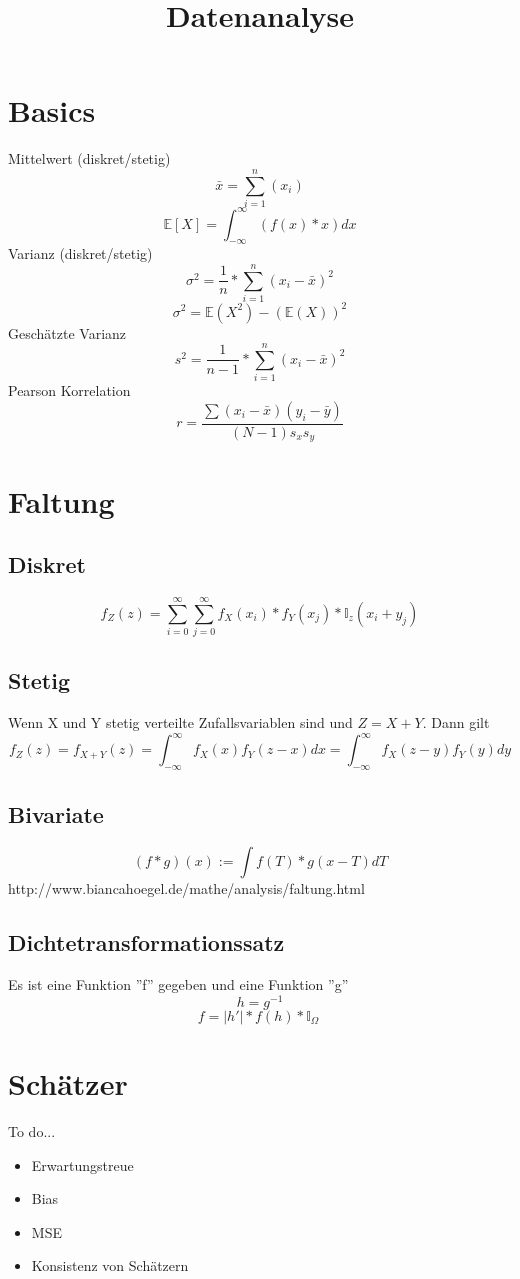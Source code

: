 \documentclass{article}
\title{Datenanalyse}
\begin{document}
	\maketitle
	\section{Basics}
	Mittelwert (diskret/stetig)
	\[\bar{x} = \sum_{i=1}^{n}(x_i) \]	
	\[\mathbb{E}[X]=\int_{-\infty}^{\infty} (f(x)*x) dx\]
	Varianz (diskret/stetig)
	\[{\sigma}^{2} = \frac{1}{n}*\sum_{i=1}^{n}(x_i - \bar{x})^2\]
	\[{\sigma}^{2} = \mathbb{E}(X^2)-(\mathbb{E}(X))^2\]
	Geschätzte Varianz
	\[{s}^{2} = \frac{1}{n-1}*\sum_{i=1}^{n}(x_i - \bar{x})^2\]
	Pearson Korrelation
	\[r=\frac{\sum(x_i-\bar{x})(y_i-\bar{y})}{(N-1)s_x s_y}\]
	\section{Faltung}
	\subsection{Diskret}
	\[f_Z(z)=\sum_{i=0}^{\infty}\sum_{j=0}^{\infty}f_X(x_i)*f_Y(x_j)*\mathbb{I}_{z}(x_i+y_j)\]
	\subsection{Stetig}
	Wenn X und Y stetig verteilte Zufallsvariablen sind und $Z=X+Y$. Dann gilt
	\[f_Z(z)=f_{X+Y}(z)=\int_{-\infty}^{\infty}f_X(x)f_Y(z-x)dx=\int_{-\infty}^{\infty}f_X(z-y)f_Y(y)dy\]
	\subsection{Bivariate}	
	\[(f*g)(x):= \int f(T) * g(x - T) dT\]
	http://www.biancahoegel.de/mathe/analysis/faltung.html
	\subsection{Dichtetransformationssatz}
	Es ist eine Funktion ''f'' gegeben und eine Funktion ''g''
	\[h = {g}^{-1}\]
	\[f = |h'| * f(h) * \mathbb{I}_\Omega \ \]
	\section{Schätzer}
	To do...
	\begin{itemize}
		\item Erwartungstreue
		\item Bias
		\item MSE
		\item Konsistenz von Schätzern
	\end{itemize}
\end{document}
